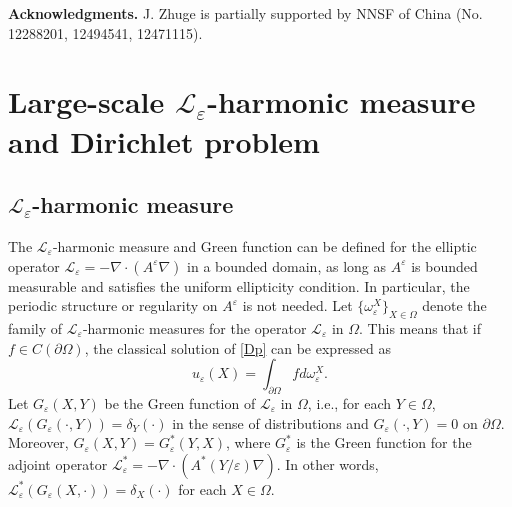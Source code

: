 \documentclass[reqno,12pt]{amsart} %
\theoremstyle{definition}
\theoremstyle{remark}
\numberwithin{equation}{section}
\newcommand{\cL}{\mathcal{L}}
\newcommand{\e}{\varepsilon}
\begin{document}
\textbf{Acknowledgments.} J. Zhuge is partially supported by NNSF of China (No. 12288201, 12494541, 12471115).


\section{Large-scale $\cL_\e$-harmonic measure and Dirichlet problem} \label{sec.Dp}

\subsection{$\cL_\e$-harmonic measure}

The $\cL_\e$-harmonic measure and Green function can be defined for the elliptic operator $\cL_\e = -\nabla\cdot (A^\e\nabla)$ in a bounded domain, as long as $A^\e$ is bounded measurable and satisfies the uniform ellipticity condition. In particular, the periodic structure or regularity on $A^\e$ is not needed.
Let $\{ \omega^X_\e \}_{X\in \Omega}$ denote the family of $\cL_\e$-harmonic measures for the operator $\cL_\e$ in $\Omega$. This means that if $f\in C(\partial \Omega)$, the classical solution of \eqref{Dp} can be expressed as
\begin{equation}\label{eq.hm}
    u_\e(X) = \int_{\partial \Omega} f d \omega^X_\e.
\end{equation}
Let $G_\e(X,Y)$ be the Green function of $\cL_\e$ in $\Omega$, i.e., for each $Y\in \Omega$, $\cL_\e(G_\e(\cdot,Y)) = \delta_Y(\cdot)$ in the sense of distributions and $G_\e(\cdot, Y) = 0$ on $\partial \Omega$. Moreover, $G_\e(X,Y) = G_\e^*(Y,X)$, where $G_\e^*$ is the Green function for the adjoint operator $\cL_\e^* = -\nabla\cdot (A^*(Y/\e) \nabla)$. In other words, $\cL_\e^*(G_\e(X,\cdot)) = \delta_X(\cdot)$ for each $X\in \Omega$.
\end{document}
